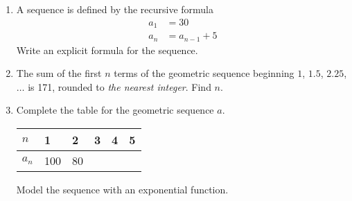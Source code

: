 \documentclass[12pt, twoside]{article}
\begin{document}
\begin{enumerate}[itemsep=0.5cm]
\item A sequence is defined by the recursive formula
\begin{align*}
a_1 &= 30 \\
a_{n} &= a_{n-1}+5
\end{align*}
Write an explicit formula for the sequence. \vspace{2cm}


\item The sum of the first $n$ terms of the geometric sequence beginning $1$, $1.5$, $2.25$, $\ldots$ is 171, rounded to \emph{the nearest integer}. Find $n$. \vspace{2cm}

\item Complete the table for the geometric sequence $a$.
    \begin{center}
    \begin{tabular}{|p{1cm}|p{1cm}|p{1cm}|p{1cm}|p{1cm}|p{1cm}|}
        \hline
        $n$ & 1 & 2 & 3 & 4 & 5 \\
        \hline
        $a_n$ & 100 & 80 & & & \\[0.25cm]
        \hline
    \end{tabular}
    \end{center}
    Model the sequence with an exponential function.



\end{enumerate}
\end{document}
